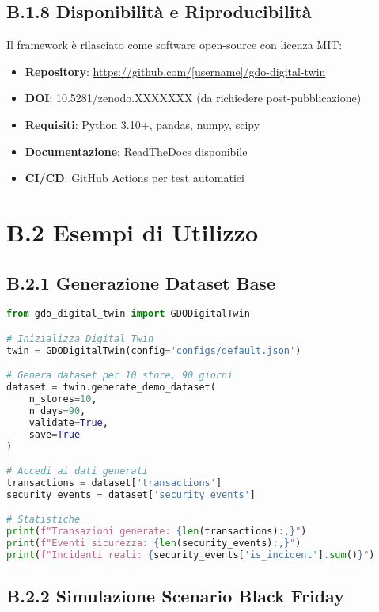 \subsection{B.1.8 Disponibilità e Riproducibilità}

Il framework è rilasciato come software open-source con licenza MIT:

\begin{itemize}
    \item \textbf{Repository}: \url{https://github.com/[username]/gdo-digital-twin}
    \item \textbf{DOI}: 10.5281/zenodo.XXXXXXX (da richiedere post-pubblicazione)
    \item \textbf{Requisiti}: Python 3.10+, pandas, numpy, scipy
    \item \textbf{Documentazione}: ReadTheDocs disponibile
    \item \textbf{CI/CD}: GitHub Actions per test automatici
\end{itemize}

\section{B.2 Esempi di Utilizzo}

\subsection{B.2.1 Generazione Dataset Base}

\begin{lstlisting}[language=Python, caption={Esempio generazione dataset base}]
from gdo_digital_twin import GDODigitalTwin

# Inizializza Digital Twin
twin = GDODigitalTwin(config='configs/default.json')

# Genera dataset per 10 store, 90 giorni
dataset = twin.generate_demo_dataset(
    n_stores=10,
    n_days=90,
    validate=True,
    save=True
)

# Accedi ai dati generati
transactions = dataset['transactions']
security_events = dataset['security_events']

# Statistiche
print(f"Transazioni generate: {len(transactions):,}")
print(f"Eventi sicurezza: {len(security_events):,}")
print(f"Incidenti reali: {security_events['is_incident'].sum()}")
\end{lstlisting}

\subsection{B.2.2 Simulazione Scenario Black Friday}

